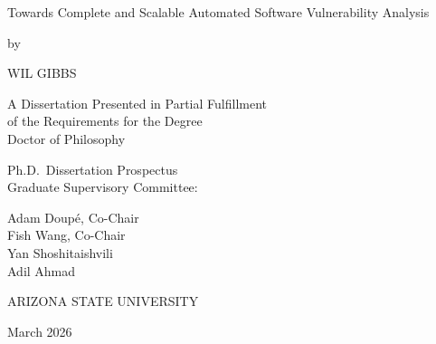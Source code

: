 \begin{titlepage}
\centering
\singlespacing
\vspace*{1in}

Towards Complete and Scalable Automated Software Vulnerability Analysis\\

\vspace{0.5in}

by

\vspace{0.5in}

WIL GIBBS

\vspace{1.5in}

A Dissertation Presented in Partial Fulfillment\\
of the Requirements for the Degree\\
Doctor of Philosophy

\vfill

Ph.D.\ Dissertation Prospectus\\
Graduate Supervisory Committee:

\vspace{0.3in}

Adam Doup\'{e}, Co-Chair\\
Fish Wang, Co-Chair\\
Yan Shoshitaishvili\\
Adil Ahmad

\vfill

ARIZONA STATE UNIVERSITY

\vspace{0.3in}

March 2026

\end{titlepage}

\newpage
\thispagestyle{empty}
\mbox{}
\newpage
